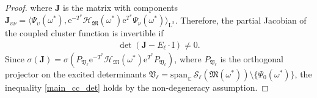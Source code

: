 \documentclass[10pt,a4paper]{amsart}
\begin{document}
\begin{proof}
    where $\mathbf{J}$ is the matrix with components $\mathbf{J}_{\upsilon \nu}=\big\langle \Psi_\upsilon(\omega^*),\mathrm{e}^{-T^*}\mathcal{H}_\mathfrak{M}(\omega^*)\mathrm{e}^{T^*}\Psi_\nu(\omega^*)\big\rangle_{\mathrm{L}^2}$. Therefore, the partial Jacobian of the coupled cluster function is invertible if \begin{align}\label{main_cc_det}
        \det(\mathbf{J}-E_{\ell}\cdot\mathrm{I})\ne 0.
    \end{align} 
     Since $\sigma(\mathbf{J})=\sigma(P_{\mathfrak{V}_\ell}\mathrm{e}^{-T^*}\mathcal{H}_{\mathfrak{M}}(\omega^*)\mathrm{e}^{T^*}P_{\mathfrak{V}_\ell})$, where $P_{\mathfrak{V}_\ell}$ is the orthogonal projector on the excited determinants  $\mathfrak{V}_\ell=\mathrm{span}_{\mathbb{C}}\,\mathcal{S}_\ell(\mathfrak{M}(\omega^*))\setminus  \lbrace \Psi_0(\omega^*) \rbrace$, the inequality \eqref{main_cc_det} holds by the non-degeneracy assumption.
\end{proof}
\end{document}
